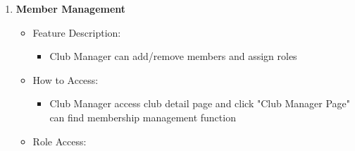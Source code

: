 \begin{enumerate}
      \begin{itemize}
      \item
        Feature Description:
    
        \begin{itemize}
        \item
          Enables club members to personalize club homepages, share their
          ideas with image uploads, notices, event widgets, and clocks using
          React Grid Layout.
        \end{itemize}
      \item
        How to Access:
    
        \begin{itemize}
        \item
          Click "Club hubs" on the Navbar then select club.
        \end{itemize}
      \item
        Role Access:
    
        \begin{itemize}
        \item
          Every club members can access, view and edit.
        \end{itemize}
      \item
        Business Goal:
    
        \begin{itemize}
        \item
          Helps clubs build their identity and promote diversity on the
          platform.
        \end{itemize}
      \end{itemize}
    \item
      \textbf{Member Management}
    
      \begin{itemize}
      \item
        Feature Description:
    
        \begin{itemize}
        \item
          Club Manager can add/remove members and assign roles
        \end{itemize}
      \item
        How to Access:
    
        \begin{itemize}
        \item
          Club Manager access club detail page and click "Club Manager Page"
          can find membership management function
        \end{itemize}
      \item
        Role Access:
    

\end{itemize}
\end{enumerate}
